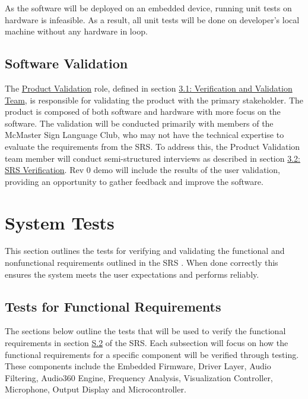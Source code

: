 \documentclass[12pt, titlepage]{article}
\begin{document}
As the software will be deployed on an embedded device, running unit tests on
hardware is infeasible. As a result, all unit tests will be done on developer's
local machine without any hardware in loop.

\subsection{Software Validation}\label{sec:software_validation}

The \hyperref[role:product_validation]{Product Validation} role, defined in
section \hyperref[sec:vnv_team]{3.1: Verification and Validation Team}, is
responsible for validating the product with the primary stakeholder. The
product is composed of both software and hardware with more focus on the
software. The validation will be conducted primarily with members of the
McMaster Sign Language Club, who may not have the technical expertise to
evaluate the requirements from the SRS. To address this, the Product Validation
team member will conduct semi-structured interviews as described in section
\hyperref[sec:srs_verification]{3.2: SRS Verification}. Rev 0 demo will include
the results of the user validation, providing an opportunity to gather feedback
and improve the software.

\section{System Tests} \label{sec:system_tests}

This section outlines the tests for verifying and validating the functional and 
nonfunctional requirements outlined in the SRS \citep{SRS}. When done correctly 
this ensures the system meets the user expectations and performs reliably. 

\subsection{Tests for Functional Requirements}

The sections below outline the tests that will be used to verify the functional 
requirements in section \hyperref[SRS-sec:S.2]{S.2} of the SRS. Each subsection 
will focus on how the functional requirements for a specific component will be 
verified through testing. These components include the Embedded Firmware, 
Driver Layer, Audio Filtering, Audio360 Engine, Frequency Analysis, 
Visualization Controller, Microphone, Output Display and Microcontroller. 
\end{document}
